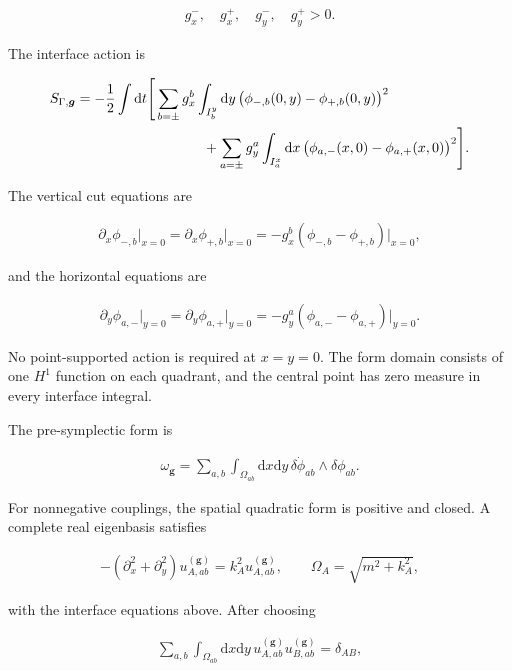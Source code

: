 \begin{align}
g_x^-,\quad g_x^+,\quad g_y^-,\quad g_y^+>0.
\end{align}

The interface action is

\begin{align}
\begin{aligned}
S_{\Gamma,\boldsymbol g}
&=-\frac12\int\mathrm dt\Bigg[
\sum_{b=\pm}g_x^b\int_{I_b^y}\mathrm dy\,
\bigl(\phi_{-,b}(0,y)-\phi_{+,b}(0,y)\bigr)^2 \\
&\hspace{32mm}
+\sum_{a=\pm}g_y^a\int_{I_a^x}\mathrm dx\,
\bigl(\phi_{a,-}(x,0)-\phi_{a,+}(x,0)\bigr)^2
\Bigg].
\end{aligned}
\end{align}

The vertical cut equations are

\begin{align}
\partial_x\phi_{-,b}\big|_{x=0}
=\partial_x\phi_{+,b}\big|_{x=0}
=-g_x^b(\phi_{-,b}-\phi_{+,b})\big|_{x=0},
\end{align}

and the horizontal equations are

\begin{align}
\partial_y\phi_{a,-}\big|_{y=0}
=\partial_y\phi_{a,+}\big|_{y=0}
=-g_y^a(\phi_{a,-}-\phi_{a,+})\big|_{y=0}.
\end{align}

No point-supported action is required at $x=y=0$. The form domain consists of one $H^1$ function on each quadrant, and the central point has zero measure in every interface integral.

The pre-symplectic form is

\begin{align}
\omega_{\boldsymbol g}
=\sum_{a,b}\int_{\Omega_{ab}}\mathrm dx\mathrm dy\,
\delta\dot\phi_{ab}\wedge\delta\phi_{ab}.
\end{align}

For nonnegative couplings, the spatial quadratic form is positive and closed. A complete real eigenbasis satisfies

\begin{align}
-(\partial_x^2+\partial_y^2)u_{A,ab}^{(\boldsymbol g)}
=k_A^2u_{A,ab}^{(\boldsymbol g)},
\qquad
\Omega_A=\sqrt{m^2+k_A^2},
\end{align}

with the interface equations above. After choosing

\begin{align}
\sum_{a,b}\int_{\Omega_{ab}}\mathrm dx\mathrm dy\,
u_{A,ab}^{(\boldsymbol g)}u_{B,ab}^{(\boldsymbol g)}
=\delta_{AB},
\end{align}

